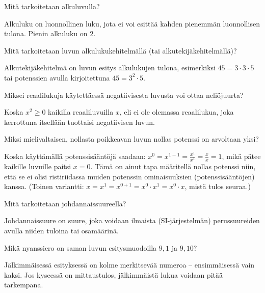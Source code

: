 \begin{tehtava}
Mitä tarkoitetaan alkuluvulla?
\begin{vastaus}
Alkuluku on luonnollinen luku, jota ei voi esittää kahden pienemmän luonnollisen tulona. Pienin alkuluku on $2$. %
\end{vastaus}
\end{tehtava}

\begin{tehtava}
Mitä tarkoitetaan luvun alkulukukehitelmällä (tai alkutekijäkehitelmällä)?
\begin{vastaus}
Alkutekijäkehitelmä on luvun esitys alkulukujen tulona, esimerkiksi $45=3\cdot 3 \cdot 5$ tai potenssien avulla kirjoitettuna $45=3^2\cdot 5$.
\end{vastaus}
\end{tehtava}

\begin{tehtava}
Miksei reaalilukuja käytettäessä negatiivisesta luvusta voi ottaa neliöjuurta?
\begin{vastaus}
Koska $x^2 \geq 0$ kaikilla reaaliluvuilla $x$, eli ei ole olemassa reaalilukua, joka kerrottuna itsellään tuottaisi negatiivisen luvun.
\end{vastaus}
\end{tehtava}

\begin{tehtava}
Miksi mielivaltaisen, nollasta poikkeavan luvun nollas potenssi on arvoltaan yksi?
\begin{vastaus}
Koska käyttämällä potenssisääntöjä saadaan: $x^0=x^{1-1}=\frac{x^1}{x^1}=\frac{x}{x}=1$, mikä pätee kaikille luvuille paitsi $x=0$. Tämä on ainut tapa määritellä nollas potenssi niin, että se ei olisi ristiriidassa muiden potenssin ominaisuuksien (potenssisääntöjen) kanssa. (Toinen variantti: $x=x^1=x^{0+1}=x^0 \cdot x^1 = x^0 \cdot x$, mistä tulos seuraa.)
\end{vastaus}
\end{tehtava}

\begin{tehtava}
Mitä tarkoitetaan johdannaissuureella?
\begin{vastaus}
Johdannaissuure on suure, joka voidaan ilmaista (SI-järjestelmän) perussuureiden avulla niiden tuloina tai osamäärinä.
\end{vastaus}
\end{tehtava}

\begin{tehtava}
Mikä nyanssiero on saman luvun esitysmuodoilla $9,1$ ja $9,10$?
\begin{vastaus}
Jälkimmäisessä esityksessä on kolme merkitsevää numeroa -- ensimmäisessä vain kaksi. Jos kyseessä on mittaustulos, jälkimmäistä lukua voidaan pitää tarkempana.
\end{vastaus}
\end{tehtava}

